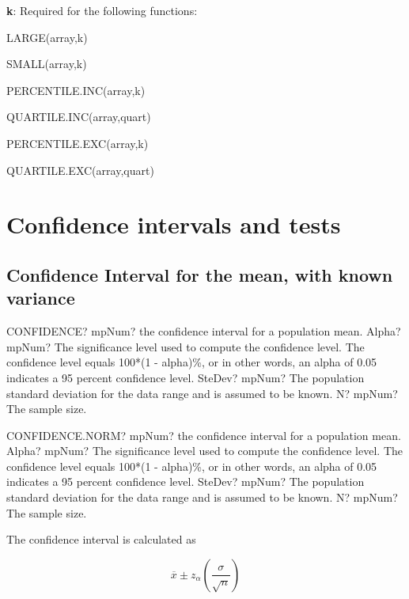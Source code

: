 \vspace{0.3cm}
\textsf{\textbf{k}}: Required for the following functions:

LARGE(array,k) 

SMALL(array,k) 

PERCENTILE.INC(array,k) 

QUARTILE.INC(array,quart) 

PERCENTILE.EXC(array,k) 

QUARTILE.EXC(array,quart) 



\newpage
\section{Confidence intervals and tests}
\subsection{Confidence Interval for the mean, with known variance}

\begin{mpFunctionsExtract}
	\mpWorksheetFunctionThreeNotImplemented
	{CONFIDENCE? mpNum? the confidence interval for a population mean.}
	{Alpha? mpNum? The significance level used to compute the confidence level. The confidence level equals 100*(1 - alpha)\%, or in other words, an alpha of 0.05 indicates a 95 percent confidence level.
	}
	{SteDev? mpNum? The population standard deviation for the data range and is assumed to be known.}
	{N? mpNum? The sample size.}
\end{mpFunctionsExtract}

\vspace{0.6cm}
\begin{mpFunctionsExtract}
	\mpWorksheetFunctionThreeNotImplemented
	{CONFIDENCE.NORM? mpNum? the confidence interval for a population mean.}
	{Alpha? mpNum? The significance level used to compute the confidence level. The confidence level equals 100*(1 - alpha)\%, or in other words, an alpha of 0.05 indicates a 95 percent confidence level.
	}
	{SteDev? mpNum? The population standard deviation for the data range and is assumed to be known.}
	{N? mpNum? The sample size.}
\end{mpFunctionsExtract}


The confidence interval is calculated as

\begin{equation}
	\overline{x} \pm z_{\alpha} \left(\frac{\sigma}{\sqrt{n}} \right)
\end{equation}



